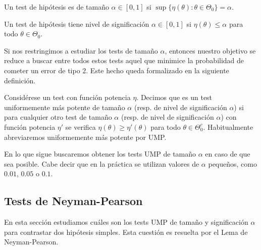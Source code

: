         \begin{definition}
            Un test de hipótesis es de tamaño $\alpha \in [0,1]$ si $\sup\{\eta(\theta): \theta \in \Theta_0\} = \alpha$.
        \end{definition}

        \begin{definition}
            Un test de hipótesis tiene nivel de significación $\alpha \in [0,1]$ si $\eta(\theta) \le \alpha$ para todo $\theta \in \Theta_0$.
        \end{definition}

        Si nos restringimos a estudiar los tests de tamaño $\alpha$, entonces nuestro objetivo se reduce a buscar entre todos estos tests aquel que minimice la probabilidad de cometer un error de tipo 2. Este hecho queda formalizado en la siguiente definición.

        \begin{definition}
            Considérese un test con función potencia $\eta$. Decimos que es un test uniformemente más potente de tamaño $\alpha$ (resp. de nivel de significación $\alpha$)  si para cualquier otro test de tamaño $\alpha$ (resp. de nivel de significación $\alpha$) con función potencia $\eta'$ se verifica $\eta(\theta) \ge \eta'(\theta)$ para todo $\theta \in \Theta_0^c$. Habitualmente abreviaremos uniformemente más potente por UMP.
        \end{definition}

        En lo que sigue buscaremos obtener los tests UMP de tamaño $\alpha$ en caso de que sea posible. Cabe decir que en la práctica se utilizan valores de $\alpha$ pequeños, como $0.01$, $0.05$ o $0.1$.

    \subsection{Tests de Neyman-Pearson}

        En esta sección estudiamos cuáles son los tests UMP de tamaño y significación $\alpha$ para contrastar dos hipótesis simples. Esta cuestión es resuelta por el Lema de Neyman-Pearson. %

